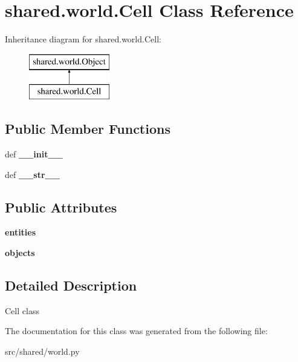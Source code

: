 \hypertarget{classshared_1_1world_1_1_cell}{\section{shared.\-world.\-Cell \-Class \-Reference}
\label{classshared_1_1world_1_1_cell}
}
\-Inheritance diagram for shared.\-world.\-Cell\-:\begin{figure}[H]
\begin{center}
\leavevmode
\includegraphics[height=2.000000cm]{classshared_1_1world_1_1_cell}
\end{center}
\end{figure}
\subsection*{\-Public \-Member \-Functions}
\begin{DoxyCompactItemize}
\item 
\hypertarget{classshared_1_1world_1_1_cell_a0118e886999031ffd25c5bbbb1cbbb69}{def {\bfseries \-\_\-\-\_\-init\-\_\-\-\_\-}}\label{classshared_1_1world_1_1_cell_a0118e886999031ffd25c5bbbb1cbbb69}

\item 
\hypertarget{classshared_1_1world_1_1_cell_a0cfc901e0fc9b607e5989cf771839753}{def {\bfseries \-\_\-\-\_\-str\-\_\-\-\_\-}}\label{classshared_1_1world_1_1_cell_a0cfc901e0fc9b607e5989cf771839753}

\end{DoxyCompactItemize}
\subsection*{\-Public \-Attributes}
\begin{DoxyCompactItemize}
\item 
\hypertarget{classshared_1_1world_1_1_cell_a7943d5f6c5131da87033be9957b5dba3}{{\bfseries entities}}\label{classshared_1_1world_1_1_cell_a7943d5f6c5131da87033be9957b5dba3}

\item 
\hypertarget{classshared_1_1world_1_1_cell_aa60854c595ae3be4e3cd3a6d2b0ed05e}{{\bfseries objects}}\label{classshared_1_1world_1_1_cell_aa60854c595ae3be4e3cd3a6d2b0ed05e}

\end{DoxyCompactItemize}


\subsection{\-Detailed \-Description}
\begin{DoxyVerb}Cell class \end{DoxyVerb}
 

\-The documentation for this class was generated from the following file\-:\begin{DoxyCompactItemize}
\item 
src/shared/world.\-py\end{DoxyCompactItemize}
